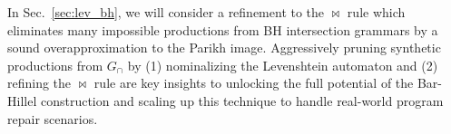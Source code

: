 \documentclass[sigplan,acmsmall,nonacm,screen]{acmart}\settopmatter{printfolios=false,printccs=false,printacmref=false}
\begin{document}
%
%

In Sec.~\ref{sec:lev_bh}, we will consider a refinement to the $\Join$ rule which eliminates many impossible productions from BH intersection grammars by a sound overapproximation to the Parikh image. Aggressively pruning synthetic productions from $G_\cap$ by (1) nominalizing the Levenshtein automaton and (2) refining the $\Join$ rule are key insights to unlocking the full potential of the Bar-Hillel construction and scaling up this technique to handle real-world program repair scenarios.
\end{document}
